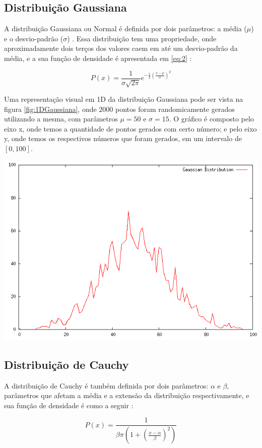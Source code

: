 \subsection{Distribuição Gaussiana}
A distribuição Gaussiana ou Normal é definida por dois parâmetros: a média ($\mu$) e o desvio-padrão ($\sigma$) \cite{fister}. Essa distribuição tem uma propriedade, onde aproximadamente dois terços dos valores caem em até um desvio-padrão da média, e a sua função de densidade é apresentada em \ref{eq:2} \cite{fister}:

\begin{equation}
\label{eq:2}
P(x) = \frac{1}{\sigma \sqrt{2\pi}}e^{-\frac{1}{2}(\frac{x - \mu}{\sigma})^2}
\end{equation}

Uma representação visual em 1D da distribuição Gaussiana pode ser vista na figura \ref{fig:1DGaussiana}, onde 2000 pontos foram randomicamente gerados utilizando a mesma, com parâmetros $\mu = 50$ e $\sigma = 15$. O gráfico é composto pelo eixo x, onde temos a quantidade de pontos gerados com certo número; e pelo eixo y, onde temos os respectivos números que foram gerados, em um intervalo de $[0, 100]$.

{
    \centering
    \includegraphics[width=0.6\linewidth]{figuras/DistribuicaoGaussiana.png}
    \label{fig:1DGaussiana}
}

\subsection{Distribuição de Cauchy}
A distribuição de Cauchy é também definida por dois parâmetros: $\alpha$ e $\beta$, parâmetros que afetam a média e a extensão da distribuição respectivamente, e sua função de densidade é como a seguir \cite{thomsen}:

\begin{equation}
P(x) = \frac{1}{\beta \pi (1 + (\frac{x - \alpha}{\beta})^2)}
\end{equation}

